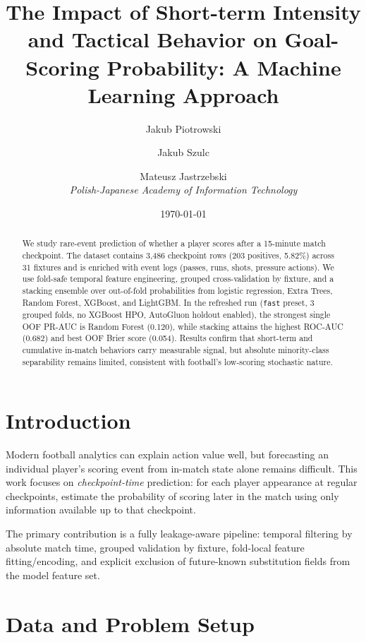 \documentclass[11pt, a4paper]{article}
\title{The Impact of Short-term Intensity and Tactical Behavior on Goal-Scoring Probability: A Machine Learning Approach}
\author{
    Jakub Piotrowski \and Jakub Szulc \and Mateusz Jastrzebski \\
    \vspace{0.2cm}
    \textit{Polish-Japanese Academy of Information Technology}
}
\date{\today}
\begin{document}
\maketitle

\begin{abstract}
We study rare-event prediction of whether a player scores after a 15-minute match checkpoint. The dataset contains 3,486 checkpoint rows (203 positives, 5.82\%) across 31 fixtures and is enriched with event logs (passes, runs, shots, pressure actions). We use fold-safe temporal feature engineering, grouped cross-validation by fixture, and a stacking ensemble over out-of-fold probabilities from logistic regression, Extra Trees, Random Forest, XGBoost, and LightGBM. In the refreshed run (\texttt{fast} preset, 3 grouped folds, no XGBoost HPO, AutoGluon holdout enabled), the strongest single OOF PR-AUC is Random Forest (0.120), while stacking attains the highest ROC-AUC (0.682) and best OOF Brier score (0.054). Results confirm that short-term and cumulative in-match behaviors carry measurable signal, but absolute minority-class separability remains limited, consistent with football's low-scoring stochastic nature.
\end{abstract}

\section{Introduction}
Modern football analytics can explain action value well, but forecasting an individual player's scoring event from in-match state alone remains difficult. This work focuses on \emph{checkpoint-time} prediction: for each player appearance at regular checkpoints, estimate the probability of scoring later in the match using only information available up to that checkpoint.

The primary contribution is a fully leakage-aware pipeline: temporal filtering by absolute match time, grouped validation by fixture, fold-local feature fitting/encoding, and explicit exclusion of future-known substitution fields from the model feature set.

\section{Data and Problem Setup}
\end{document}
